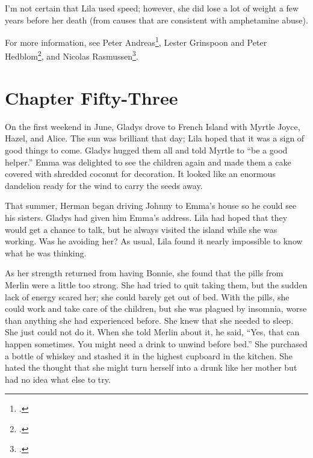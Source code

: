\documentclass[
  letterpaper,
]{book}
\begin{document}
I'm not certain that Lila used speed; however, she did lose a lot of
weight a few years before her death (from causes that are consistent
with amphetamine abuse).

For more information, see Peter Andreas\footnote{.},
Lester Grinspoon and Peter Hedblom\footnote{.}, and Nicolas Rasmussen\footnote{.}.


\chapter{Chapter Fifty-Three}\label{chapter-fifty-three}

On the first weekend in June, Gladys drove to French Island with Myrtle
Joyce, Hazel, and Alice. The sun was brilliant that day; Lila hoped that
it was a sign of good things to come. Gladys hugged them all and told
Myrtle to ``be a good helper.'' Emma was delighted to see the children
again and made them a cake covered with shredded coconut for decoration.
It looked like an enormous dandelion ready for the wind to carry the
seeds away.

That summer, Herman began driving Johnny to Emma's house so he could see
his sisters. Gladys had given him Emma's address. Lila had hoped that
they would get a chance to talk, but he always visited the island while
she was working. Was he avoiding her? As usual, Lila found it nearly
impossible to know what he was thinking.

As her strength returned from having Bonnie, she found that the pills
from Merlin were a little too strong. She had tried to quit taking them,
but the sudden lack of energy scared her; she could barely get out of
bed. With the pills, she could work and take care of the children, but
she was plagued by insomnia, worse than anything she had experienced
before. She knew that she needed to sleep. She just could not do it.
When she told Merlin about it, he said, ``Yes, that can happen
sometimes. You might need a drink to unwind before bed.'' She purchased
a bottle of whiskey and stashed it in the highest cupboard in the
kitchen. She hated the thought that she might turn herself into a drunk
like her mother but had no idea what else to try.
\end{document}

